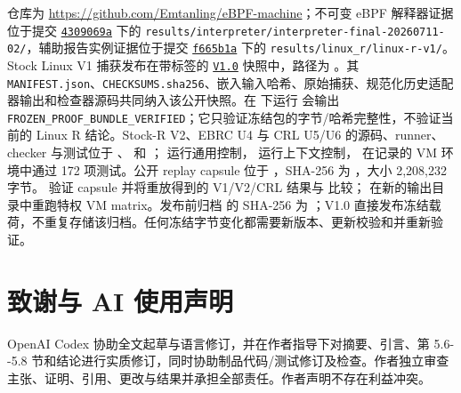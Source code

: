 \documentclass[
  11pt,
  a4paper,
]{ctexart}
\begin{document}
仓库为 \url{https://github.com/Emtanling/eBPF-machine}；不可变 eBPF
解释器证据位于提交
\href{https://github.com/Emtanling/eBPF-machine/tree/4309069a1f94d642d5c1402eb710e089c85059b1}{\texttt{4309069a}}
下的
\texttt{results/interpreter/interpreter-final-20260711-02/}，辅助报告实例证据位于提交
\href{https://github.com/Emtanling/eBPF-machine/tree/f665b1a2f9a772ee9b2c08a73d116ea283aa5efb}{\texttt{f665b1a}}
下的 \texttt{results/linux\_r/linux-r-v1/}。Stock Linux V1
捕获发布在带标签的
\href{https://github.com/Emtanling/eBPF-machine/tree/V1.0/residuality-auditor/stock-linux-r-proof}{\texttt{V1.0}}
快照中，路径为 。其
\texttt{MANIFEST.json}、\texttt{CHECKSUMS.sha256}、嵌入输入哈希、原始捕获、规范化历史适配器输出和检查器源码共同纳入该公开快照。在
 下运行
会输出
\texttt{FROZEN\_PROOF\_BUNDLE\_VERIFIED}；它只验证冻结包的字节/哈希完整性，不验证当前的
Linux R 结论。Stock-R V2、EBRC U4 与 CRL U5/U6 的源码、runner、checker
与测试位于
、
和 ；
运行通用控制，
运行上下文控制， 在记录的 VM 环境中通过
172 项测试。公开 replay capsule 位于
，SHA-256
为
，大小
2,208,232 字节。 验证 capsule
并将重放得到的 V1/V2/CRL 结果与
比较； 在新的输出目录中重跑特权
 VM matrix。发布前归档
 的 SHA-256 为
；V1.0
直接发布冻结载荷，不重复存储该归档。任何冻结字节变化都需要新版本、更新校验和并重新验证。

\hypertarget{ux81f4ux8c22ux4e0e-ai-ux4f7fux7528ux58f0ux660e}{%
\section{致谢与 AI
使用声明}\label{ux81f4ux8c22ux4e0e-ai-ux4f7fux7528ux58f0ux660e}}

OpenAI Codex 协助全文起草与语言修订，并在作者指导下对摘要、引言、第
5.6-\/-5.8
节和结论进行实质修订，同时协助制品代码/测试修订及检查。作者独立审查主张、证明、引用、更改与结果并承担全部责任。作者声明不存在利益冲突。
\end{document}
